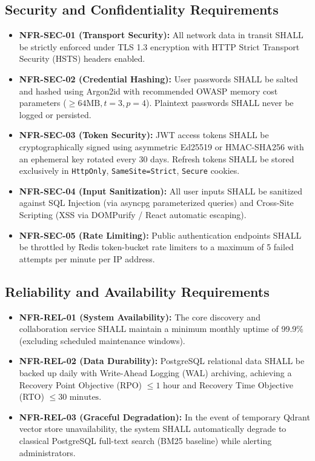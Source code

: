 \documentclass[11pt,a4paper]{article}
\begin{document}
\subsection{Security and Confidentiality Requirements}
\begin{itemize}[noitemsep]
    \item \textbf{NFR-SEC-01 (Transport Security):} All network data in transit SHALL be strictly enforced under TLS 1.3 encryption with HTTP Strict Transport Security (HSTS) headers enabled.
    \item \textbf{NFR-SEC-02 (Credential Hashing):} User passwords SHALL be salted and hashed using Argon2id with recommended OWASP memory cost parameters ($\ge 64\text{MB}, t=3, p=4$). Plaintext passwords SHALL never be logged or persisted.
    \item \textbf{NFR-SEC-03 (Token Security):} JWT access tokens SHALL be cryptographically signed using asymmetric Ed25519 or HMAC-SHA256 with an ephemeral key rotated every 30 days. Refresh tokens SHALL be stored exclusively in \texttt{HttpOnly}, \texttt{SameSite=Strict}, \texttt{Secure} cookies.
    \item \textbf{NFR-SEC-04 (Input Sanitization):} All user inputs SHALL be sanitized against SQL Injection (via asyncpg parameterized queries) and Cross-Site Scripting (XSS via DOMPurify / React automatic escaping).
    \item \textbf{NFR-SEC-05 (Rate Limiting):} Public authentication endpoints SHALL be throttled by Redis token-bucket rate limiters to a maximum of 5 failed attempts per minute per IP address.
\end{itemize}

\subsection{Reliability and Availability Requirements}
\begin{itemize}[noitemsep]
    \item \textbf{NFR-REL-01 (System Availability):} The core discovery and collaboration service SHALL maintain a minimum monthly uptime of 99.9\% (excluding scheduled maintenance windows).
    \item \textbf{NFR-REL-02 (Data Durability):} PostgreSQL relational data SHALL be backed up daily with Write-Ahead Logging (WAL) archiving, achieving a Recovery Point Objective (RPO) $\le 1\text{ hour}$ and Recovery Time Objective (RTO) $\le 30\text{ minutes}$.
    \item \textbf{NFR-REL-03 (Graceful Degradation):} In the event of temporary Qdrant vector store unavailability, the system SHALL automatically degrade to classical PostgreSQL full-text search (BM25 baseline) while alerting administrators.
\end{itemize}
\end{document}
